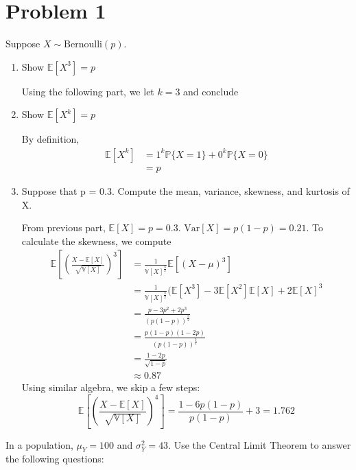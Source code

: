 \documentclass[11pt]{article}
\newcommand{\Var}{\text{Var}}
\newcommand{\bbE}{\mathbb{E}}
\newcommand{\bbP}{\mathbb{P}}
\newcommand{\bbV}{\mathbb{V}}
\begin{document}
	
	
	\psetheader

\section*{Problem 1}
Suppose $X\sim\text{Bernoulli}(p).$ 
\begin{enumerate}
    \item Show $\bbE[X^3] = p$
\begin{solution}
Using the following part, we let $k = 3$ and conclude
\end{solution}
\item Show $\bbE[X^k]= p$
\begin{solution}
    By definition, 
    \begin{align*}
        \bbE[X^k] &= 1^k \bbP\{X = 1\} + 0^k\bbP\{X = 0\}\\
        &= \boxed{p}
    \end{align*}
\end{solution}
\item Suppose that p = 0.3. Compute the mean, variance, skewness, and kurtosis of X.
\begin{solution}
    From previous part, $\bbE[X] = p = \boxed{0.3}.$ $\Var[X] = p(1-p) = \boxed{0.21}.$ To calculate the skewness, we compute 
    \begin{align*}
        \bbE\left[\left(\frac{X - \bbE[X]}{\sqrt{\bbV[X]}}\right)^3\right] &= \frac{1}{\bbV[X]^\frac{3}{2}}\bbE[(X - \mu)^3]\\
        &= \frac{1}{\bbV[X]^\frac{3}{2}}(\bbE[X^3] - 3\bbE[X^2]\bbE[X] + 2\bbE[X]^3\\
        &= \frac{p - 3p^2 + 2p^3}{(p(1-p))^\frac{3}{2}}\\
        &= \frac{p(1-p)(1-2p)}{(p(1-p))^\frac{3}{2}}\\
        &= \frac{1-2p}{\sqrt{1-p}}\\
        &\approx \boxed{0.87}
    \end{align*}
    Using similar algebra, we skip a few steps:
    \[\bbE\left[\left(\frac{X - \bbE[X]}{\sqrt{\bbV[X]}}\right)^4\right] = \frac{1-6p(1-p)}{p(1-p)} +3= \boxed{1.762}\]
\end{solution}
\end{enumerate}
In a population, $\mu_Y = 100$ and $\sigma_Y^2 = 43$. Use the Central Limit Theorem to answer the following questions:
\end{document}
